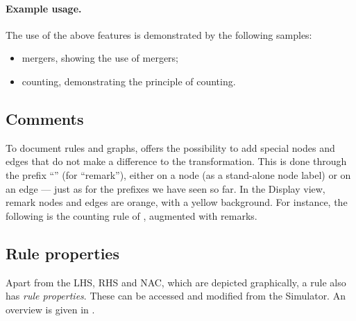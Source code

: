 \paragraph{Example usage.}

The use of the above features is demonstrated by the following \GROOVE samples:
%
\begin{itemize}[noitemsep]
\item \textsf{mergers}, showing the use of mergers;
\item \textsf{counting}, demonstrating the principle of counting.
\end{itemize}

\subsection{Comments}

To document rules and graphs, \GROOVE offers the possibility to add special
nodes and edges that do not make a difference to the transformation. This is
done through the prefix ``\remP'' (for ``remark''), either on a node (as a
stand-alone node label) or on an edge --- just as for the prefixes we have seen
so far. In the Display view, remark nodes and edges are orange, with a yellow
background. For instance, the following is the counting rule of
, augmented with remarks.


\subsection{Rule properties}

Apart from the LHS, RHS and NAC, which are depicted graphically, a rule also
has \emph{rule properties}. These can be accessed and modified from the
Simulator. An overview is given in .

